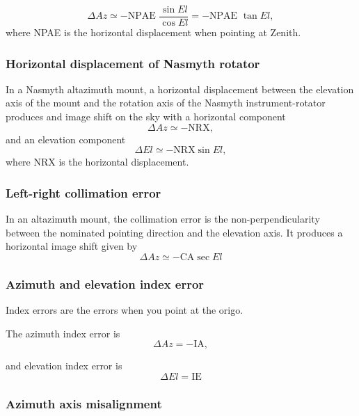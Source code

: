 \begin{equation}
    \Delta Az \simeq - \text{NPAE } \frac{\sin{El}}{\cos{El}}= - \text{NPAE } \tan{El},
\end{equation}
where NPAE is the horizontal displacement when pointing at Zenith.

\subsubsection{Horizontal displacement of Nasmyth rotator}
In a Nasmyth altazimuth mount, a horizontal displacement between the elevation axis of the mount and the rotation axis of the Nasmyth instrument-rotator produces
and image shift on the sky with a horizontal component
\begin{equation}
    \Delta Az \simeq - \text{NRX},
\end{equation}
and an elevation component
\begin{equation}
    \Delta El \simeq - \text{NRX} \sin{El},
\end{equation}
where NRX is the horizontal displacement.

\subsubsection{Left-right collimation error}
In an altazimuth mount, the collimation error is the non-perpendicularity between the nominated pointing direction and the elevation axis.
It produces a horizontal image shift given by
\begin{equation}
    \Delta Az \simeq -\text{CA} \sec{El}
\end{equation}


\subsubsection{Azimuth and elevation index error}
Index errors are the errors when you point at the origo.

The azimuth index error is 
\begin{equation}
    \Delta Az = -\text{IA},
\end{equation}

and elevation index error is
\begin{equation}
    \Delta El = \text{IE}
\end{equation}

\subsubsection{Azimuth axis misalignment} 

